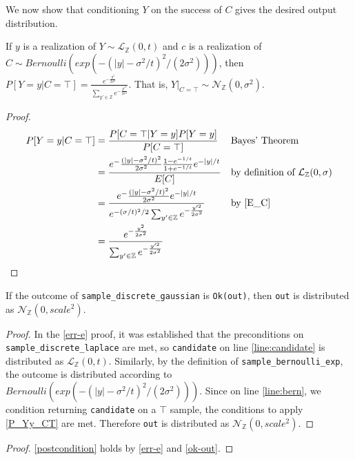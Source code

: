\documentclass{article}
\begin{document}
We now show that conditioning $Y$ on the success of $C$ gives the desired output distribution. 
\begin{theorem}\cite{CKS20} 
    \label{P_Yy_CT} If $y$ is a realization of $Y \sim \mathcal{L}_\mathbb{Z}(0, t)$ and $c$ is a realization of $C \sim Bernoulli(exp(-(|y| - \sigma^2 / t)^2 / (2 \sigma^2)))$, then 
    $P[Y=y | C=\top] = \frac{e^{-\frac{y^2}{2\sigma^2}}}{\sum_{y' \in \mathbb{Z}} e^{-\frac{y'^2}{2\sigma^2}}}$. That is, $Y|_{C=\top} \sim \mathcal{N}_\mathbb{Z}(0, \sigma^2)$. 
\end{theorem} 
 
\begin{proof} 
    \begin{align*} 
        P[Y=y | C=\top] &= \frac{P[C=\top|Y=y]P[Y=y]}{P[C=\top]} && \text{Bayes' Theorem} \\ 
        &= \frac{e^-\frac{(|y| - \sigma^2/t)^2}{2\sigma^2} \frac{1 - e^{-1/t}}{1 + e^{-1/t}} e^{-|y|/t}}{E[C]} && \text{by definition of } \mathcal{L}_\mathbb{Z}(0, \sigma) \\ 
        &= \frac{e^-\frac{(|y| - \sigma^2/t)^2}{2\sigma^2} e^{-|y|/t}}{e^{-(\sigma/t)^2/2} \sum_{y' \in \mathbb{Z}} e^{-\frac{y'^2}{2\sigma^2}}} && \text{by } \ref{E_C}\\ 
        &= \frac{e^{-\frac{y^2}{2\sigma^2}}}{\sum_{y' \in \mathbb{Z}} e^{-\frac{y'^2}{2\sigma^2}}} 
    \end{align*} 
\end{proof} 
 
\begin{lemma}\label{ok-out} 
    If the outcome of \texttt{sample\_discrete\_gaussian} is \texttt{Ok(out)},  
    then \texttt{out} is distributed as $\mathcal{N}_\mathbb{Z}(0, scale^2)$. 
\end{lemma} 
 
\begin{proof} 
    In the \ref{err-e} proof, it was established that the preconditions on \texttt{sample\_discrete\_laplace} are met,  
    so \texttt{candidate} on line \ref{line:candidate} is distributed as $\mathcal{L}_\mathbb{Z}(0, t)$. 
    Similarly, by the definition of \texttt{sample\_bernoulli\_exp}, the outcome is distributed according to $Bernoulli(exp(-(|y| - \sigma^2 / t)^2 / (2 \sigma^2)))$. 
    Since on line \ref{line:bern}, we condition returning \texttt{candidate} on a $\top$ sample,  
    the conditions to apply \ref{P_Yy_CT} are met.  
    Therefore \texttt{out} is distributed as $\mathcal{N}_\mathbb{Z}(0, scale^2)$. 
\end{proof} 
 
\begin{proof} 
    \ref{postcondition} holds by \ref{err-e} and \ref{ok-out}. 
\end{proof} 
 
 
 
 
\end{document}
